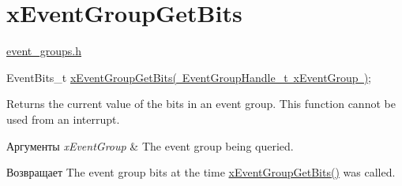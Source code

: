 \hypertarget{group__x_event_group_get_bits}{}\section{x\+Event\+Group\+Get\+Bits}
\label{group__x_event_group_get_bits}
\mbox{\hyperlink{event__groups_8h}{event\+\_\+groups.\+h}} 
\begin{DoxyPre}
   EventBits\_t \mbox{\hyperlink{event__groups_8h_a0ae86f092fb07ccb475ae938f9a12584}{xEventGroupGetBits( EventGroupHandle\_t xEventGroup )}};
\end{DoxyPre}


Returns the current value of the bits in an event group. This function cannot be used from an interrupt.


\begin{DoxyParams}{Аргументы}
{\em x\+Event\+Group} & The event group being queried.\\
\hline
\end{DoxyParams}
\begin{DoxyReturn}{Возвращает}
The event group bits at the time \mbox{\hyperlink{event__groups_8h_a0ae86f092fb07ccb475ae938f9a12584}{x\+Event\+Group\+Get\+Bits()}} was called. 
\end{DoxyReturn}
